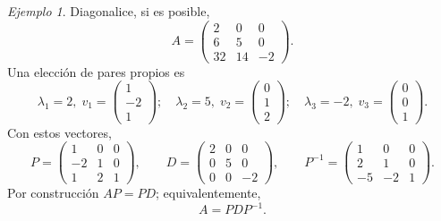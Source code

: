 \documentclass[12pt]{article}
\theoremstyle{remark}
\newtheorem{Ejem}[definicion]{Ejemplo}
\begin{document}
\begin{Ejem}

Diagonalice, si es posible,
\[
A=\begin{pmatrix}2 & 0 & 0\\6 & 5 & 0\\32 & 14 & -2\end{pmatrix}.
\]
\scriptsize
Una elección de pares propios es
\[
\lambda_1=2,\;v_1=\begin{pmatrix}1\\-2\\1\end{pmatrix};\quad \lambda_2=5,\;v_2=\begin{pmatrix}0\\1\\2\end{pmatrix};\quad \lambda_3=-2,\;v_3=\begin{pmatrix}0\\0\\1\end{pmatrix}.
\]
Con estos vectores,
\[
P=\begin{pmatrix}1 & 0 & 0\\-2 & 1 & 0\\1 & 2 & 1\end{pmatrix},\qquad D=\begin{pmatrix}2 & 0 & 0\\0 & 5 & 0\\0 & 0 & -2\end{pmatrix},\qquad P^{-1}=\begin{pmatrix}1 & 0 & 0\\2 & 1 & 0\\-5 & -2 & 1\end{pmatrix}.
\]
Por construcción $AP=PD$; equivalentemente,
\[
\boxed{A=PDP^{-1}}.
\]
\end{Ejem}
\end{document}
